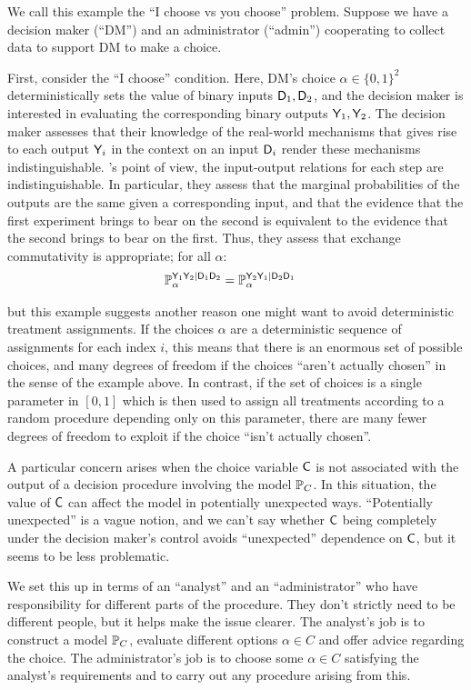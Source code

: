 We call this example the ``I choose vs you choose'' problem. Suppose we have a decision maker (``DM'') and an administrator (``admin'') cooperating to collect data to support DM to make a choice.

First, consider the ``I choose'' condition. Here, DM's choice $\alpha\in \{0,1\}^2$ deterministically sets the value of binary inputs $\mathsf{D}_1,\mathsf{D}_2$, and the decision maker is interested in evaluating the corresponding binary outputs $\mathsf{Y}_1,\mathsf{Y}_2$. The decision maker assesses that their knowledge of the real-world mechanisms that gives rise to each output $\mathsf{Y}_i$ in the context on an input $\mathsf{D}_i$ render these mechanisms indistinguishable. 's point of view, the input-output relations for each step are indistinguishable. In particular, they assess that the marginal probabilities of the outputs are the same given a corresponding input, and that the evidence that the first experiment brings to bear on the second is equivalent to the evidence that the second brings to bear on the first. Thus, they assess that exchange commutativity is appropriate; for all $\alpha$:
\begin{align}
    \mathbb{P}_\alpha^{\mathsf{Y}_1\mathsf{Y}_2|\mathsf{D}_1\mathsf{D}_2} &= \mathbb{P}_\alpha^{\mathsf{Y}_2\mathsf{Y}_1|\mathsf{D}_2\mathsf{D}_1}
\end{align}


but this example suggests another reason one might want to avoid deterministic treatment assignments. If the choices $\alpha$ are a deterministic sequence of assignments for each index $i$, this means that there is an enormous set of possible choices, and many degrees of freedom if the choices ``aren't actually chosen'' in the sense of the example above. In contrast, if the set of choices is a single parameter in $[0,1]$ which is then used to assign all treatments according to a random procedure depending only on this parameter, there are many fewer degrees of freedom to exploit if the choice ``isn't actually chosen''.

A particular concern arises when the choice variable $\mathsf{C}$ is not associated with the output of a decision procedure involving the model $\mathbb{P}_C$. In this situation, the value of $\mathsf{C}$ can affect the model in potentially unexpected ways. ``Potentially unexpected'' is a vague notion, and we can't say whether $\mathsf{C}$ being completely under the decision maker's control avoids ``unexpected'' dependence on $\mathsf{C}$, but it seems to be less problematic.

We set this up in terms of an ``analyst'' and an ``administrator'' who have responsibility for different parts of the procedure. They don't strictly need to be different people, but it helps make the issue clearer. The analyst's job is to construct a model $\mathbb{P}_C$, evaluate different options $\alpha\in C$ and offer advice regarding the choice. The administrator's job is to choose some $\alpha\in C$ satisfying the analyst's requirements and to carry out any procedure arising from this.

